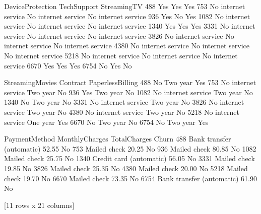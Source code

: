 \documentclass[letterpaper,10pt,english]{jupyterBook}
\begin{document}
\begin{sphinxVerbatim}[commandchars=\\\{\}]
         DeviceProtection          TechSupport          StreamingTV  \PYGZbs{}
488                   Yes                  Yes                  Yes   
753   No internet service  No internet service  No internet service   
936                   Yes                   No                  Yes   
1082  No internet service  No internet service  No internet service   
1340                  Yes                  Yes                  Yes   
3331  No internet service  No internet service  No internet service   
3826  No internet service  No internet service  No internet service   
4380  No internet service  No internet service  No internet service   
5218  No internet service  No internet service  No internet service   
6670                  Yes                  Yes                  Yes   
6754                   No                  Yes                   No   

          StreamingMovies  Contract PaperlessBilling  \PYGZbs{}
488                    No  Two year              Yes   
753   No internet service  Two year               No   
936                   Yes  Two year               No   
1082  No internet service  Two year               No   
1340                   No  Two year               No   
3331  No internet service  Two year               No   
3826  No internet service  Two year               No   
4380  No internet service  Two year               No   
5218  No internet service  One year              Yes   
6670                   No  Two year               No   
6754                   No  Two year              Yes   

                  PaymentMethod MonthlyCharges  TotalCharges Churn  
488   Bank transfer (automatic)          52.55                  No  
753                Mailed check          20.25                  No  
936                Mailed check          80.85                  No  
1082               Mailed check          25.75                  No  
1340    Credit card (automatic)          56.05                  No  
3331               Mailed check          19.85                  No  
3826               Mailed check          25.35                  No  
4380               Mailed check          20.00                  No  
5218               Mailed check          19.70                  No  
6670               Mailed check          73.35                  No  
6754  Bank transfer (automatic)          61.90                  No  

[11 rows x 21 columns]
\end{sphinxVerbatim}
\end{document}
